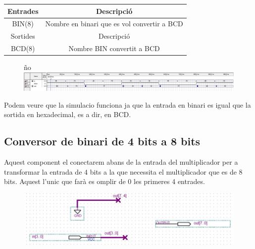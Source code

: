 \documentclass[12pt, a4papre]{article}
\begin{document}
	\begin{table}[h!]
		\centering
		 \begin{tabular}{|c | c|} 
			 \hline
			 Entrades & Descripció\\ [0.5ex] 
			 \hline
			 BIN(8) &  Nombre en binari que es vol convertir a BCD\\ 
			 \hline\hline
			 Sortides & Descripció\\ [0.5ex] 
			 \hline
			 BCD(8) & Nombre BIN convertit a BCD\\ 
			 \hline
		 \end{tabular}
	\end{table}
	
	\begin{figure}[H]
		\begin{center}ño 
		\includegraphics[width=130mm]{selSimulacio.jpeg}
		\end{center}
	\end{figure}
	
	Podem veure que la simulacio funciona ja que la entrada en binari es igual que la sortida en hexadecimal, es a dir, en BCD.
	
	\subsection{Conversor de binari de 4 bits a 8 bits}
	
	Aquest component el conectarem abans de la entrada del multiplicador per a transformar la entrada de 4 bits a la que necessita el multiplicador que es de 8 bits. Aquest l'unic que farà es omplir de 0 les primeres 4 entrades.
	\begin{figure}[H]
		\begin{center}
		\includegraphics[width=130mm]{Bin_4_8.jpeg}
		\end{center}
	\end{figure}
	
\end{document}
